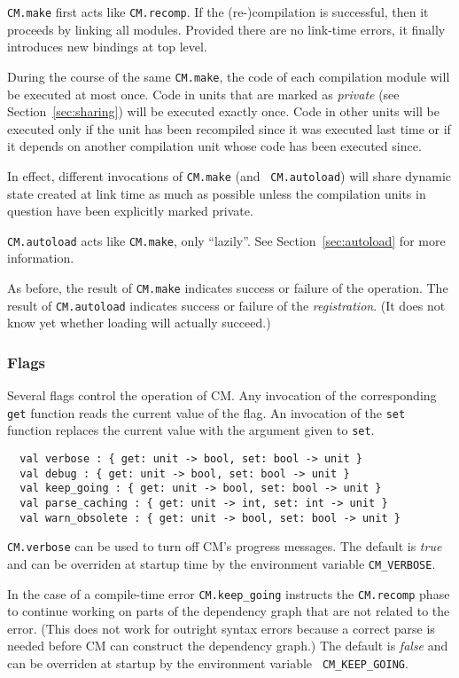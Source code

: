 \documentclass{article}
\begin{document}
{\tt CM.make} first acts like {\tt CM.recomp}.  If the (re-)compilation
is successful, then it proceeds by linking all modules.  Provided
there are no link-time errors, it finally introduces new bindings at
top level.

During the course of the same {\tt CM.make}, the code of each
compilation module will be executed at most once.  Code in units that
are marked as {\it private} (see Section~\ref{sec:sharing}) will be
executed exactly once.  Code in other units will be executed only if
the unit has been recompiled since it was executed last time or if it
depends on another compilation unit whose code has been executed
since.

In effect, different invocations of {\tt CM.make} (and {\tt
CM.autoload}) will share dynamic state created at link time as much as
possible unless the compilation units in question have been explicitly
marked private.

{\tt CM.autoload} acts like {\tt CM.make}, only ``lazily''. See
Section~\ref{sec:autoload} for more information.

As before, the result of {\tt CM.make} indicates success or failure of
the operation.  The result of {\tt CM.autoload} indicates success or
failure of the {\em registration}.  (It does not know yet whether
loading will actually succeed.)

\subsubsection*{Flags}

Several flags control the operation of CM.  Any invocation of the
corresponding {\tt get} function reads the current value of the flag.  An
invocation of the {\tt set} function replaces the current value with
the argument given to {\tt set}.

\begin{verbatim}
  val verbose : { get: unit -> bool, set: bool -> unit }
  val debug : { get: unit -> bool, set: bool -> unit }
  val keep_going : { get: unit -> bool, set: bool -> unit }
  val parse_caching : { get: unit -> int, set: int -> unit }
  val warn_obsolete : { get: unit -> bool, set: bool -> unit }
\end{verbatim}

{\tt CM.verbose} can be used to turn off CM's progress messages.  The
default is {\em true} and can be overriden at startup time by the
environment variable {\tt CM\_VERBOSE}.

In the case of a compile-time error {\tt CM.keep\_going} instructs the
{\tt CM.recomp} phase to continue working on parts of the dependency
graph that are not related to the error.  (This does not work for
outright syntax errors because a correct parse is needed before CM can
construct the dependency graph.)  The default is {\em false} and can
be overriden at startup by the environment variable {\tt
CM\_KEEP\_GOING}.
\end{document}
